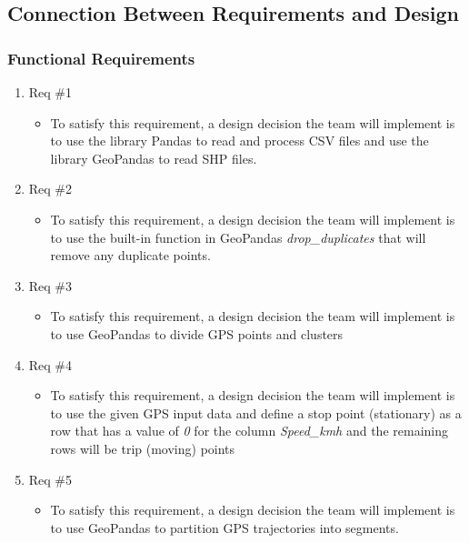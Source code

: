 \documentclass[12pt, titlepage]{article}
\begin{document}
\subsection{Connection Between Requirements and Design} \label{SecConnection}
  
\subsubsection{Functional Requirements}

\begin{enumerate}
    \item Req \#1
    \begin{itemize}
        \item To satisfy this requirement, a design decision the team will implement is to use the library Pandas to read and process CSV files and use the library GeoPandas to read SHP files.
    \end{itemize}
    \item Req \#2
    \begin{itemize}
        \item To satisfy this requirement, a design decision the team will implement is to use the built-in function in GeoPandas \emph{drop\_duplicates} that will remove any duplicate points.
    \end{itemize}
    \item Req \#3
    \begin{itemize}
        \item To satisfy this requirement, a design decision the team will implement is to use GeoPandas to divide GPS points and clusters
    \end{itemize}
    \item Req \#4
    \begin{itemize}
        \item To satisfy this requirement, a design decision the team will implement is to use the given GPS input data and define a stop point (stationary) as a row that has a value of \emph{0} for the column \emph{Speed\_kmh} and the remaining rows will be trip (moving) points %
    \end{itemize}
    \item Req \#5
    \begin{itemize}
        \item To satisfy this requirement, a design decision the team will implement is to use GeoPandas to partition GPS trajectories into segments.
    \end{itemize}

\end{enumerate}
\end{document}
